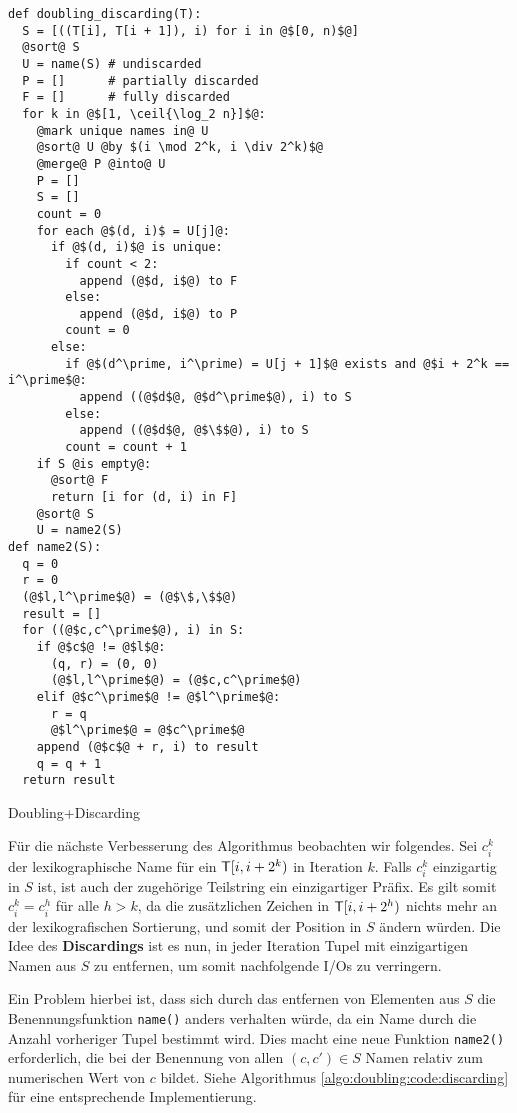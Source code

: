 \begin{listing}[htp]
\begin{verbatim}
def doubling_discarding(T):
  S = [((T[i], T[i + 1]), i) for i in @$[0, n)$@]
  @sort@ S
  U = name(S) # undiscarded
  P = []      # partially discarded
  F = []      # fully discarded
  for k in @$[1, \ceil{\log_2 n}]$@:
    @mark unique names in@ U
    @sort@ U @by $(i \mod 2^k, i \div 2^k)$@
    @merge@ P @into@ U
    P = []
    S = []
    count = 0
    for each @$(d, i)$ = U[j]@:
      if @$(d, i)$@ is unique:
        if count < 2:
          append (@$d, i$@) to F
        else:
          append (@$d, i$@) to P
        count = 0
      else:
        if @$(d^\prime, i^\prime) = U[j + 1]$@ exists and @$i + 2^k == i^\prime$@:
          append ((@$d$@, @$d^\prime$@), i) to S
        else:
          append ((@$d$@, @$\$$@), i) to S
        count = count + 1
    if S @is empty@:
      @sort@ F
      return [i for (d, i) in F]
    @sort@ S
    U = name2(S)
def name2(S):
  q = 0
  r = 0
  (@$l,l^\prime$@) = (@$\$,\$$@)
  result = []
  for ((@$c,c^\prime$@), i) in S:
    if @$c$@ != @$l$@:
      (q, r) = (0, 0)
      (@$l,l^\prime$@) = (@$c,c^\prime$@)
    elif @$c^\prime$@ != @$l^\prime$@:
      r = q
      @$l^\prime$@ = @$c^\prime$@
    append (@$c$@ + r, i) to result
    q = q + 1
  return result
\end{verbatim}
\caption{Doubling+Discarding} 
\label{algo:doubling:code:discarding}
\end{listing}

Für die nächste Verbesserung des Algorithmus beobachten wir folgendes. Sei $c_i^k$ der lexikographische Name für ein $\inputtext{}[i, i + 2^k)$ in Iteration $k$. Falls $c_i^k$ einzigartig in $S$ ist, ist auch der zugehörige Teilstring ein einzigartiger Präfix. Es gilt somit $c_i^k = c_i^h$ für alle $h > k$, da die zusätzlichen Zeichen in $\inputtext{}[i, i + 2^h)$ nichts mehr an der lexikografischen Sortierung, und somit der Position in $S$ ändern würden. Die Idee des \textbf{Discardings} ist es nun, in jeder Iteration Tupel mit einzigartigen Namen aus $S$ zu entfernen, um somit nachfolgende I/Os zu verringern. 

Ein Problem hierbei ist, dass sich durch das entfernen von Elementen aus $S$ die Benennungsfunktion \texttt{name()} anders verhalten würde, da ein Name durch die Anzahl vorheriger Tupel bestimmt wird. Dies macht eine neue Funktion \texttt{name2()} erforderlich, die bei der Benennung von allen $(c, c') \in S$ Namen relativ zum numerischen Wert von $c$ bildet. Siehe Algorithmus \ref{algo:doubling:code:discarding} für eine entsprechende Implementierung.

